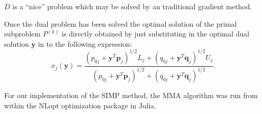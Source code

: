 $D$ is a ``nice'' problem which may be solved by an traditional gradient method.

Once the dual problem has been solved the optimal solution of the primal subproblem $P^{(k)}$ is directly obtained by just substituting in the optimal dual solution $\mathbf{y}$ in to the following expression:
$$x_j(\mathbf{y})=\frac{\left(p_{0j}+\mathbf{y}^T\mathbf{p}_j\right)^{1/2}L_j+\left(q_{0j}+\mathbf{y}^T\mathbf{q}_j\right)^{1/2}U_j}{\left(p_{0j}+\mathbf{y}^T\mathbf{p}_j\right)^{1/2}+\left(q_{0j}+\mathbf{y}^T\mathbf{q}_j\right)^{1/2}}.$$

For our implementation of the SIMP method, the MMA algorithm was run from within the NLopt optimization package in Julia.